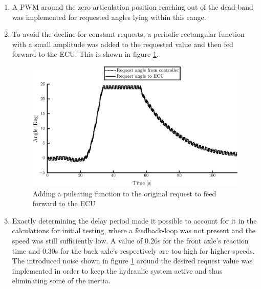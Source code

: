 \documentclass[root.tex]{subfiles}
\begin{document}
	\begin{enumerate}
		\item A \gls{PWM} around the zero-articulation position reaching out of the dead-band was implemented for requested angles lying within this range. 
		
		\item To avoid the decline for constant requests, a periodic rectangular function with a small amplitude was added to the requested value and then fed forward to the \gls{ECU}. This is shown in figure \ref{fig:Request_with_pulse}. 
		
		\begin{figure}[h!]

\includegraphics[width=1\linewidth]{Request_with_pulse}
\caption[Adding a pulsating function to the original request to feed forward to the ECU]{Adding a pulsating function to the original request to feed forward to the ECU}
\label{fig:Request_with_pulse}
\end{figure}

		
		\item Exactly determining the delay period made it possible to account for it in the calculations for initial testing, where a feedback-loop was not present and the speed was still sufficiently low. A value of 0.26\unit{s} for the front axle's reaction time and 0.30\unit{s} for the back axle's respectively are too high for higher speeds.\\
		The introduced noise shown in figure \ref{fig:Request_with_pulse} around the desired request value was implemented in order to keep the hydraulic system active and thus eliminating some of the inertia. 
	\end{enumerate}
	
	
	
	
	
	
\end{document}
